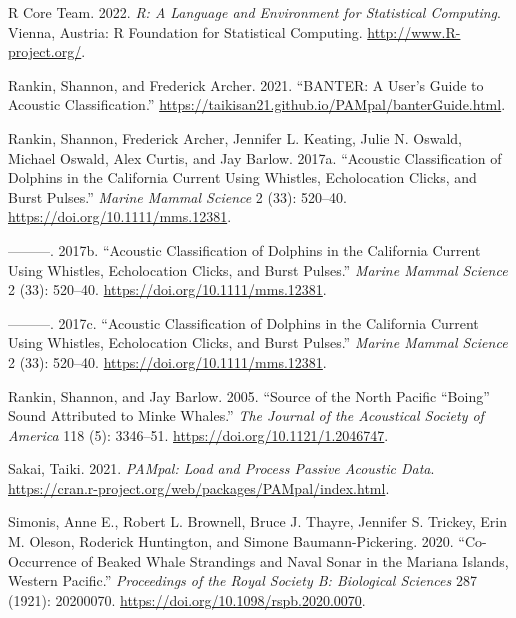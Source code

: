 \documentclass[
  letterpaper,
  DIV=11,
  numbers=noendperiod]{scrartcl}
\newlength{\cslhangindent}
\newlength{\cslentryspacingunit} %
\newenvironment{CSLReferences}[2] %
 {%
  \setlength{\parindent}{0pt}
  \ifodd #1
  \let\oldpar\par
  \def\par{\hangindent=\cslhangindent\oldpar}
  \fi
  \setlength{\parskip}{#2\cslentryspacingunit}
 }%
 {}
\begin{document}
\begin{CSLReferences}{1}{0}
\leavevmode{}%
R Core Team. 2022. \emph{R: A Language and Environment for Statistical
Computing}. Vienna, Austria: R Foundation for Statistical Computing.
\url{http://www.R-project.org/}.

\leavevmode{}%
Rankin, Shannon, and Frederick Archer. 2021. {``BANTER: A User's Guide
to Acoustic Classification.''}
\url{https://taikisan21.github.io/PAMpal/banterGuide.html}.

\leavevmode{}%
Rankin, Shannon, Frederick Archer, Jennifer L. Keating, Julie N. Oswald,
Michael Oswald, Alex Curtis, and Jay Barlow. 2017a. {``Acoustic
Classification of Dolphins in the California Current Using Whistles,
Echolocation Clicks, and Burst Pulses.''} \emph{Marine Mammal Science} 2
(33): 520--40. \url{https://doi.org/10.1111/mms.12381}.

\leavevmode{}%
---------. 2017b. {``Acoustic Classification of Dolphins in the
California Current Using Whistles, Echolocation Clicks, and Burst
Pulses.''} \emph{Marine Mammal Science} 2 (33): 520--40.
\url{https://doi.org/10.1111/mms.12381}.

\leavevmode{}%
---------. 2017c. {``Acoustic Classification of Dolphins in the
California Current Using Whistles, Echolocation Clicks, and Burst
Pulses.''} \emph{Marine Mammal Science} 2 (33): 520--40.
\url{https://doi.org/10.1111/mms.12381}.

\leavevmode{}%
Rankin, Shannon, and Jay Barlow. 2005. {``Source of the North Pacific
{``}Boing{''} Sound Attributed to Minke Whales.''} \emph{The Journal of
the Acoustical Society of America} 118 (5): 3346--51.
\url{https://doi.org/10.1121/1.2046747}.

\leavevmode{}%
Sakai, Taiki. 2021. \emph{PAMpal: Load and Process Passive Acoustic
Data}. \url{https://cran.r-project.org/web/packages/PAMpal/index.html}.

\leavevmode{}%
Simonis, Anne E., Robert L. Brownell, Bruce J. Thayre, Jennifer S.
Trickey, Erin M. Oleson, Roderick Huntington, and Simone
Baumann-Pickering. 2020. {``Co-Occurrence of Beaked Whale Strandings and
Naval Sonar in the Mariana Islands, Western Pacific.''}
\emph{Proceedings of the Royal Society B: Biological Sciences} 287
(1921): 20200070. \url{https://doi.org/10.1098/rspb.2020.0070}.


\end{CSLReferences}
\end{document}
